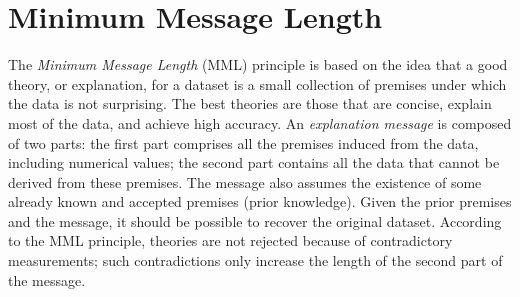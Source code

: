 






%
%
\section{Minimum Message Length}
\label{sec:MML}

The \emph{Minimum Message Length} (MML) principle is based on the idea that a good theory, or explanation, for a dataset is a small collection of premises under which the data is not surprising. The best theories are those that are concise, explain most of the data, and achieve high accuracy. An \emph{explanation message} is composed of two parts: the first part comprises all the premises induced from the data, including numerical values; the second part contains all the data that cannot be derived from these premises. The message also assumes the existence of some already known and accepted premises (prior knowledge). Given the prior premises and the message, it should be possible to recover the original dataset. According to the MML principle, theories are not rejected because of contradictory measurements; such contradictions only increase the length of the second part of the message.

